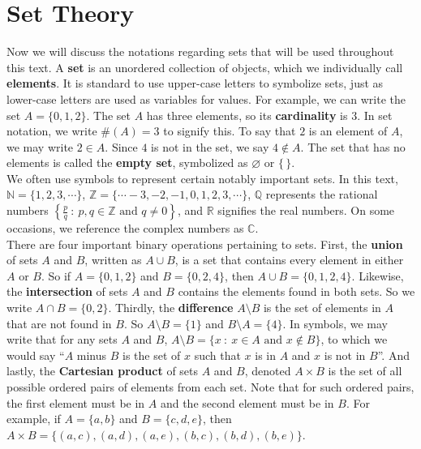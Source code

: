 \section{Set Theory}
Now we will discuss the notations regarding sets that will be used throughout this text. A \textbf{set} is an unordered collection of objects, which we individually call \textbf{elements}. It is standard to use upper-case letters to symbolize sets, just as lower-case letters are used as variables for values. For example, we can write the set $A=\{0, 1, 2\}$. The set $A$ has three elements, so its \textbf{cardinality} is 3. In set notation, we write $\#(A)=3$ to signify this. To say that $2$ is an element of $A$, we may write $2\in A$. Since $4$ is not in the set, we say $4\notin A$. The set that has no elements is called the \textbf{empty set}, symbolized as $\varnothing$ or $\{\, \}$.\\

We often use symbols to represent certain notably important sets. In this text, $\mathbb{N}=\{1,2,3,\cdots\}$, $\mathbb{Z}=\{\cdots -3, -2, -1, 0, 1,2,3,\cdots\}$, $\mathbb{Q}$ represents the rational numbers $\left\{\frac{p}{q}\ :\ p,q\in\mathbb{Z}\text{ and } q\neq 0\right\}$, and $\mathbb{R}$ signifies the real numbers. On some occasions, we reference the complex numbers as $\mathbb{C}$. \\

There are four important binary operations pertaining to sets. First, the \textbf{union} of sets $A$ and $B$, written as $A\cup B$, is a set that contains every element in either $A$ or $B$. So if $A=\{0,1,2\}$ and $B=\{0,2,4\}$, then $A\cup B=\{0,1,2,4\}$. Likewise, the \textbf{intersection} of sets $A$ and $B$ contains the elements found in both sets. So we write $A\cap B=\{0,2\}$. Thirdly, the \textbf{difference} $A \setminus B$ is the set of elements in $A$ that are not found in $B$. So $A \setminus B=\{1\}$ and $B \setminus A=\{4\}$. In symbols, we may write that for any sets $A$ and $B$, $A\setminus B=\{x\ :\ x\in A \text{ and } x\notin B\}$, to which we would say ``$A$ minus $B$ is the set of $x$ such that $x$ is in $A$ and $x$ is not in $B$''. And lastly, the \textbf{Cartesian product} of sets $A$ and $B$, denoted $A\times B$ is the set of all possible ordered pairs of elements from each set. Note that for such ordered pairs, the first element must be in $A$ and the second element must be in $B$. For example, if $A=\{a,b\}$ and $B=\{c,d,e\}$, then $A\times B = \{(a,c),(a,d),(a,e),(b,c),(b,d),(b,e)\}$. 

